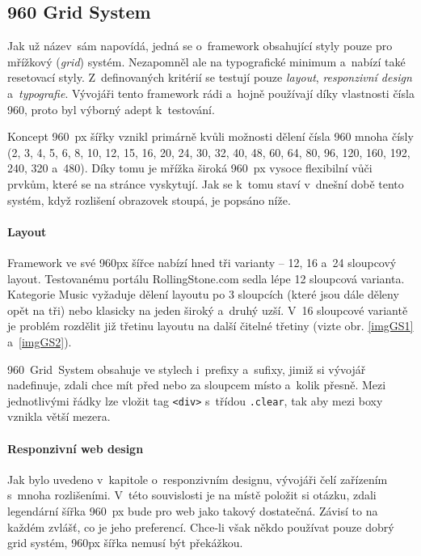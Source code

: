 \documentclass[thesis=B,czech]{FITthesis}[2012/06/26]
\begin{document}
\subsection{960 Grid System} \label{sec:gs}

Jak už název~sám napovídá, jedná se o~framework obsahující styly pouze pro mřížkový (\textit{grid})  systém. Nezapomněl ale na typografické minimum a~nabízí také resetovací styly. Z~definovaných kritérií se testují pouze \textit{layout}, \textit{responzivní design} a~\textit{typografie}. Vývojáři tento framework rádi a~hojně používají díky vlastnosti čísla 960, proto byl výborný adept k~testování.

Koncept 960~px šířky vznikl primárně kvůli možnosti dělení čísla 960 mnoha čísly (2, 3, 4, 5, 6, 8, 10, 12, 15, 16, 20, 24, 30, 32, 40, 48, 60, 64, 80, 96, 120, 160, 192, 240, 320 a~480). Díky tomu je mřížka široká 960~px vysoce flexibilní vůči prvkům, které se na stránce vyskytují. Jak se k~tomu staví v~dnešní době tento systém, když rozlišení obrazovek stoupá, je popsáno níže.

\paragraph{Layout}

Framework ve své 960px šířce nabízí hned tři varianty -- 12, 16 a~24 sloupcový layout. Testovanému portálu RollingStone.com sedla lépe 12 sloupcová varianta. Kategorie Music vyžaduje dělení layoutu po 3 sloupcích (které jsou dále děleny opět na tři) nebo klasicky na jeden široký a~druhý uzší. V~16 sloupcové variantě je problém rozdělit již třetinu layoutu na další čitelné třetiny (vizte obr. \ref{imgGS1} a~\ref{imgGS2}).



960~Grid~System obsahuje ve stylech i~prefixy a~sufixy, jimiž si vývojář nadefinuje, zdali chce mít před nebo za sloupcem místo a~kolik přesně. Mezi jednotlivými řádky lze vložit tag \verb#<div># s~třídou \verb#.clear#, tak aby mezi boxy vznikla větší mezera.

\paragraph{Responzivní web design}

Jak bylo uvedeno v~kapitole o~responzivním designu, vývojáři čelí zařízením s~mnoha rozlišeními. V~této souvislosti je na místě položit si otázku, zdali legendární šířka 960~px bude pro web jako takový dostatečná. Závisí to na každém zvlášť, co je jeho preferencí. Chce-li však někdo používat pouze dobrý grid  systém, 960px šířka nemusí být překážkou. 
\end{document}
